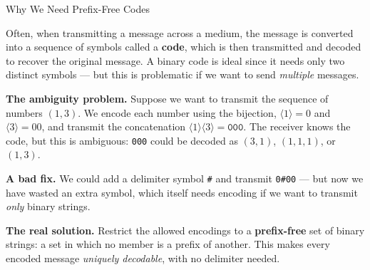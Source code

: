 \documentclass[aspectratio=169,10pt]{beamer}
\newcommand{\bij}[1]{\langle #1\rangle}
\begin{document}
\begin{frame}{Why We Need Prefix-Free Codes}

Often, when transmitting a message across a medium, the message is
converted into a sequence of symbols called a \textbf{code}, which is then
transmitted and decoded to recover the original message. A binary code is
ideal since it needs only two distinct symbols --- but this is problematic
if we want to send \emph{multiple} messages.

\medskip
\textbf{The ambiguity problem.} Suppose we want to transmit the sequence of
numbers $(1,3)$. We encode each number using the bijection, $\bij{1}=0$ and
$\bij{3}=00$, and transmit the concatenation $\bij{1}\bij{3}=\texttt{000}$.
The receiver knows the code, but this is ambiguous: \texttt{000} could be
decoded as $(3,1)$, $(1,1,1)$, or $(1,3)$.

\medskip
\textbf{A bad fix.} We could add a delimiter symbol \texttt{\#} and
transmit \texttt{0\#00} --- but now we have wasted an extra symbol, which
itself needs encoding if we want to transmit \emph{only} binary strings.

\medskip
\textbf{The real solution.} Restrict the allowed encodings to a
\textbf{prefix-free} set of binary strings: a set in which no member is a
prefix of another. This makes every encoded message \emph{uniquely
decodable}, with no delimiter needed.
\end{frame}
\end{document}
